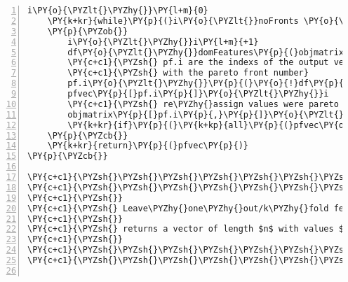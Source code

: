 \begin{Verbatim}[commandchars=\\\{\},codes={\catcode`\$=3\catcode`\^=7\catcode`\_=8},gobble=0,numbers=left,fontfamily=fvm,fontshape=n,fontsize=\footnotesize,tabsize=2]
	i\PY{o}{\PYZlt{}\PYZhy{}}\PY{l+m}{0}
	\PY{k+kr}{while}\PY{p}{(}i\PY{o}{\PYZlt{}}noFronts \PY{o}{\PYZam{}\PYZam{}} \PY{o}{!}allFrontsFound\PY{p}{)} \PY{c+c1}{\PYZsh{}go thru all fronts required}
	\PY{p}{\PYZob{}}
		i\PY{o}{\PYZlt{}\PYZhy{}}i\PY{l+m}{+1}
		df\PY{o}{\PYZlt{}\PYZhy{}}domFeatures\PY{p}{(}objmatrix\PY{p}{,}\PY{k+kp}{rep}\PY{p}{(}\PY{k+kc}{FALSE}\PY{p}{,}m\PY{p}{)}\PY{p}{)} \PY{c+c1}{\PYZsh{}general m obj vectors function}
		\PY{c+c1}{\PYZsh{} pf.i are the indexs of the output vector that need to be updated }
		\PY{c+c1}{\PYZsh{} with the pareto front number}
		pf.i\PY{o}{\PYZlt{}\PYZhy{}}\PY{p}{(}\PY{o}{!}df\PY{p}{)} \PY{o}{\PYZam{}} \PY{p}{(}pfvec\PY{o}{\PYZlt{}}\PY{l+m}{1}\PY{p}{)} 
		pfvec\PY{p}{[}pf.i\PY{p}{]}\PY{o}{\PYZlt{}\PYZhy{}}i
		\PY{c+c1}{\PYZsh{} re\PYZhy{}assign values were pareto front found}
		objmatrix\PY{p}{[}pf.i\PY{p}{,}\PY{p}{]}\PY{o}{\PYZlt{}\PYZhy{}}ourInfs
		\PY{k+kr}{if}\PY{p}{(}\PY{k+kp}{all}\PY{p}{(}pfvec\PY{o}{\PYZgt{}}\PY{l+m}{0}\PY{p}{)}\PY{p}{)} allFrontsFound\PY{o}{\PYZlt{}\PYZhy{}}\PY{k+kc}{TRUE}
	\PY{p}{\PYZcb{}}
	\PY{k+kr}{return}\PY{p}{(}pfvec\PY{p}{)}	
\PY{p}{\PYZcb{}}

\PY{c+c1}{\PYZsh{}\PYZsh{}\PYZsh{}\PYZsh{}\PYZsh{}\PYZsh{}\PYZsh{}\PYZsh{}\PYZsh{}\PYZsh{}\PYZsh{}\PYZsh{}\PYZsh{}\PYZsh{}\PYZsh{}\PYZsh{}\PYZsh{}\PYZsh{}\PYZsh{}\PYZsh{}\PYZsh{}\PYZsh{}\PYZsh{}\PYZsh{}\PYZsh{}\PYZsh{}\PYZsh{}\PYZsh{}\PYZsh{}\PYZsh{}\PYZsh{}\PYZsh{}\PYZsh{}\PYZsh{}\PYZsh{}\PYZsh{}\PYZsh{}\PYZsh{}\PYZsh{}\PYZsh{}\PYZsh{}\PYZsh{}}
\PY{c+c1}{\PYZsh{}\PYZsh{}\PYZsh{}\PYZsh{}\PYZsh{}\PYZsh{}\PYZsh{}\PYZsh{}\PYZsh{}\PYZsh{}\PYZsh{}\PYZsh{}\PYZsh{}\PYZsh{}\PYZsh{}\PYZsh{}\PYZsh{}\PYZsh{}\PYZsh{}\PYZsh{}\PYZsh{}\PYZsh{}\PYZsh{}\PYZsh{}\PYZsh{}\PYZsh{}\PYZsh{}\PYZsh{}\PYZsh{}\PYZsh{}\PYZsh{}\PYZsh{}\PYZsh{}\PYZsh{}\PYZsh{}\PYZsh{}\PYZsh{}\PYZsh{}\PYZsh{}\PYZsh{}\PYZsh{}\PYZsh{}}
\PY{c+c1}{\PYZsh{}}
\PY{c+c1}{\PYZsh{} Leave\PYZhy{}one\PYZhy{}out/k\PYZhy{}fold feature ranking}
\PY{c+c1}{\PYZsh{}}
\PY{c+c1}{\PYZsh{} returns a vector of length $n$ with values $\in (0,1]$ for feature importance		}
\PY{c+c1}{\PYZsh{}}
\PY{c+c1}{\PYZsh{}\PYZsh{}\PYZsh{}\PYZsh{}\PYZsh{}\PYZsh{}\PYZsh{}\PYZsh{}\PYZsh{}\PYZsh{}\PYZsh{}\PYZsh{}\PYZsh{}\PYZsh{}\PYZsh{}\PYZsh{}\PYZsh{}\PYZsh{}\PYZsh{}\PYZsh{}\PYZsh{}\PYZsh{}\PYZsh{}\PYZsh{}\PYZsh{}\PYZsh{}\PYZsh{}\PYZsh{}\PYZsh{}\PYZsh{}\PYZsh{}\PYZsh{}\PYZsh{}\PYZsh{}\PYZsh{}\PYZsh{}\PYZsh{}\PYZsh{}\PYZsh{}\PYZsh{}\PYZsh{}\PYZsh{}}
\PY{c+c1}{\PYZsh{}\PYZsh{}\PYZsh{}\PYZsh{}\PYZsh{}\PYZsh{}\PYZsh{}\PYZsh{}\PYZsh{}\PYZsh{}\PYZsh{}\PYZsh{}\PYZsh{}\PYZsh{}\PYZsh{}\PYZsh{}\PYZsh{}\PYZsh{}\PYZsh{}\PYZsh{}\PYZsh{}\PYZsh{}\PYZsh{}\PYZsh{}\PYZsh{}\PYZsh{}\PYZsh{}\PYZsh{}\PYZsh{}\PYZsh{}\PYZsh{}\PYZsh{}\PYZsh{}\PYZsh{}\PYZsh{}\PYZsh{}\PYZsh{}\PYZsh{}\PYZsh{}\PYZsh{}\PYZsh{}\PYZsh{}}


\end{Verbatim}
